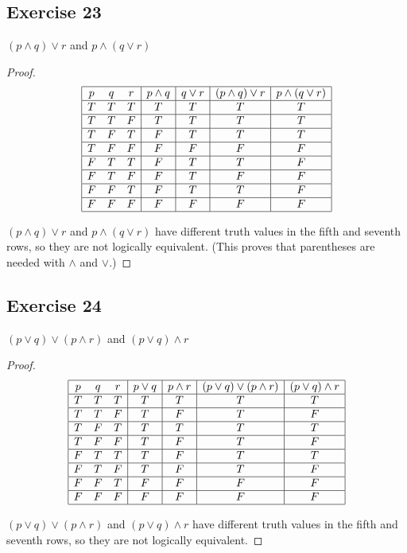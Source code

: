 \documentclass[14pt]{extarticle}
\begin{document}
\subsection{Exercise 23}
$(p \wedge q) \vee r$ and $p \wedge (q \vee r)$

\begin{proof}
$$
\begin{array}{|ccc|c|c|c|c|}
\hline
p & q & r & p \wedge q & q \vee r & (p \wedge q) \vee r & p \wedge (q \vee r)
\\\hline
T & T & T & T & T & T & T \\
\hline
T & T & F & T & T & T & T \\
\hline
T & F & T & F & T & T & T \\
\hline
T & F & F & F & F & F & F \\
\hline
F & T & T & F & T & T & F \\
\hline
F & T & F & F & T & F & F \\
\hline
F & F & T & F & T & T & F \\
\hline
F & F & F & F & F & F & F \\
\hline
\end{array}
$$

$(p \wedge q) \vee r$ and $p \wedge (q \vee r)$ have different truth values in
the fifth and seventh rows, so they are not logically equivalent. (This proves
that parentheses are needed with $\wedge$ and $\vee$.)
\end{proof}

\subsection{Exercise 24}
$(p \vee q) \vee (p \wedge r)$ and $(p \vee q) \wedge r$

\begin{proof}
$$
\begin{array}{|ccc|c|c|c|c|}
\hline
p & q & r & p \vee q & p \wedge r & (p \vee q) \vee (p \wedge r) &
(p \vee q) \wedge r \\
\hline
T & T & T & T & T & T & T \\
\hline
T & T & F & T & F & T & F \\
\hline
T & F & T & T & T & T & T \\
\hline
T & F & F & T & F & T & F \\
\hline
F & T & T & T & F & T & T \\
\hline
F & T & F & T & F & T & F \\
\hline
F & F & T & F & F & F & F \\
\hline
F & F & F & F & F & F & F \\
\hline
\end{array}
$$

$(p \vee q) \vee (p \wedge r)$ and $(p \vee q) \wedge r$ have different truth
values in the fifth and seventh rows, so they are not logically equivalent.
\end{proof}
\end{document}
